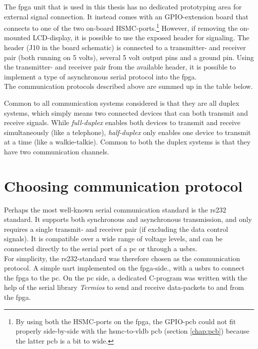 \documentclass[main.tex]{subfiles}
\begin{document}
The \gls{fpga} unit that is used in this thesis has no dedicated prototyping area for external signal connection. It instead comes with an GPIO-extension board that connects to one of the two on-board HSMC-ports.\footnote{By using both the HSMC-ports on the \gls{fpga}, the GPIO-\gls{pcb} could not fit properly side-by-side with the \acrshort{hsmc}-to-\acrshort{vldb} \acrshort{pcb} (section \ref{chap:pcb}) because the latter \gls{pcb} is a bit to wide.} However, if removing the on-mounted LCD-display, it is possible to use the exposed header for signaling. The header (J10 in the board schematic) is connected to a transmitter- and receiver pair (both running on 5 volts), several 5 volt output pins and a ground pin. Using the transmitter- and receiver pair from the available header, it is possible to implement a type of asynchronous serial protocol into the \gls{fpga}.\\


The communication protocols described above are summed up in the table below.

Common to all communication systems considered is that they are all duplex systems, which simply means two connected devices that can both transmit and receive signals. While \textit{full-duplex} enables both devices to transmit and receive simultaneously (like a telephone), \textit{half-duplex} only enables one device to transmit at a time (like a walkie-talkie). Common to both the duplex systems is that they have two communication channels. 

\section{Choosing communication protocol}
Perhaps the most well-known serial communication standard is the \gls{rs232} standard. It supports both synchronous and asynchronous transmission, and only requires a single transmit- and receiver pair (if excluding the data control signals). It is compatible over a wide range of voltage levels, and can be connected directly to the serial port of a \gls{pc} or through a \gls{usbrs}. \\

For simplicity, the \acrshort{rs232}-standard was therefore chosen as the communication protocol. A simple \gls{uart} implemented on the \gls{fpga}-side., with a \gls{usbrs} to connect the \gls{fpga} to the \gls{pc}. On the \gls{pc} side, a dedicated C-program was written with the help of the serial library \textit{Termios} to send and receive data-packets to and from the \gls{fpga}. 
\end{document}

